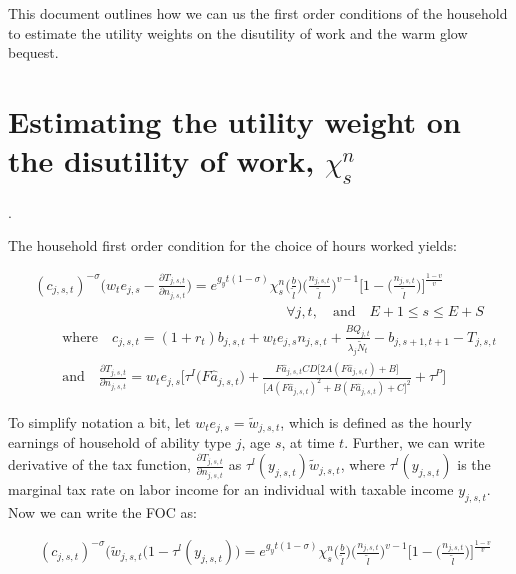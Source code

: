 \documentclass[letterpaper,12pt]{article}
\theoremstyle{definition}
\begin{document}
This document outlines how we can us the first order conditions of the household to estimate the utility weights on the disutility of work and the warm glow bequest.  

\section{Estimating the utility weight on the disutility of work, $\chi^{n}_{s}$}.

The household first order condition for the choice of hours worked yields:

        \begin{equation}\label{EqEulerLabGen}
      \begin{split}
        &(c_{j,s,t})^{-\sigma}\Biggl(w_t e_{j,s} - \frac{\partial T_{j,s,t}}{\partial n_{j,s,t}}\Biggr) = e^{g_y t(1-\sigma)}\chi^n_{s}\biggl(\frac{b}{\tilde{l}}\biggr)\biggl(\frac{n_{j,s,t}}{\tilde{l}}\biggr)^{v-1}\Biggl[1 - \biggl(\frac{n_{j,s,t}}{\tilde{l}}\biggr)\Biggr]^{\frac{1-v}{v}} \\
        &\qquad\qquad\qquad\qquad\qquad\qquad\qquad\qquad\qquad\forall j,t, \quad\text{and}\quad E+1\leq s\leq E+S \\
        &\qquad\text{where}\quad c_{j,s,t} = \left(1 + r_t\right) b_{j,s,t} + w_t e_{j,s}n_{j,s,t} + \frac{BQ_{j,t}}{\lambda_j\tilde{N}_t} - b_{j,s+1,t+1} - T_{j,s,t} \\
        &\qquad\text{and}\quad \frac{\partial T_{j,s,t}}{\partial n_{j,s,t}} = w_t e_{j,s}\biggl[\tau^I\bigl(F\hat{a}_{j,s,t}\bigr) + \frac{F\hat{a}_{j,s,t}CD\bigl[2A(F\hat{a}_{j,s,t})+B\bigr]}{\bigl[A(F\hat{a}_{j,s,t})^2+B(F \hat{a}_{j,s,t})+C\bigr]^2} + \tau^P\Biggr] 
      \end{split}
    \end{equation}
    
    To simplify notation a bit, let $w_{t}e_{j,s}=\tilde{w}_{j,s,t}$, which is defined as the hourly earnings of household of ability type $j$, age $s$, at time $t$.  Further, we can write derivative of the tax function, $ \frac{\partial T_{j,s,t}}{\partial n_{j,s,t}}$ as $\tau^{l}(y_{j,s,t})\tilde{w}_{j,s,t}$, where $\tau^{l}(y_{j,s,t})$ is the marginal tax rate on labor income for an individual with taxable income $y_{j,s,t}$.  Now we can write the FOC as:
    
            \begin{equation}\label{EqEulerLabGen}
      \begin{split}
        &(c_{j,s,t})^{-\sigma}\Biggl(\tilde{w}_{j,s,t}(1-\tau^{l}(y_{j,s,t})\Biggr) = e^{g_y t(1-\sigma)}\chi^n_{s}\biggl(\frac{b}{\tilde{l}}\biggr)\biggl(\frac{n_{j,s,t}}{\tilde{l}}\biggr)^{v-1}\Biggl[1 - \biggl(\frac{n_{j,s,t}}{\tilde{l}}\biggr)\Biggr]^{\frac{1-v}{v}} 
        \end{split}
        \end{equation}
        
\end{document}
